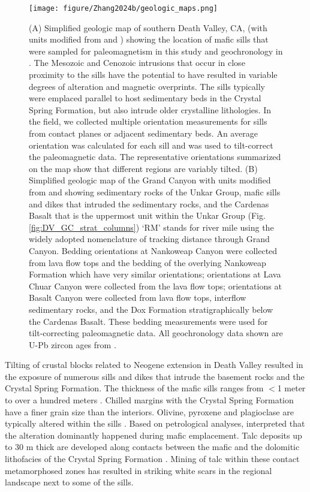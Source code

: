 \begin{figure}[h!]
\centering
\texttt{[image: figure/Zhang2024b/geologic\_maps.png]}
\caption{\footnotesize (A) Simplified geologic map of southern Death Valley, CA, (with units modified from \cite{Workman2003a} and \cite{Wrucke2007a}) showing the location of mafic sills that were sampled for paleomagnetism in this study and geochronology in \cite{Mohr2024a}. The Mesozoic and Cenozoic intrusions that occur in close proximity to the sills have the potential to have resulted in variable degrees of alteration and magnetic overprints. The sills typically were emplaced parallel to host sedimentary beds in the Crystal Spring Formation, but also intrude older crystalline lithologies. In the field, we collected multiple orientation measurements for sills from contact planes or adjacent sedimentary beds. An average orientation was calculated for each sill and was used to tilt-correct the paleomagnetic data. The representative orientations summarized on the map show that different regions are variably tilted. (B) Simplified geologic map of the Grand Canyon with units modified from \cite{Billingsley2000a} and \cite{Billingsley2003a} showing sedimentary rocks of the Unkar Group, mafic sills and dikes that intruded the sedimentary rocks, and the Cardenas Basalt that is the uppermost unit within the Unkar Group (Fig. \ref{fig:DV_GC_strat_columns}) `RM' stands for river mile using the widely adopted nomenclature of tracking distance through Grand Canyon. Bedding orientations at Nankoweap Canyon were collected from lava flow tops and the bedding of the overlying Nankoweap Formation which have very similar orientations; orientations at Lava Chuar Canyon were collected from the lava flow tops; orientations at Basalt Canyon were collected from lava flow tops, interflow sedimentary rocks, and the Dox Formation stratigraphically below the Cardenas Basalt. These bedding measurements were used for tilt-correcting paleomagnetic data. All geochronology data shown are U-Pb zircon ages from \cite{Mohr2024a}.}
\label{fig:geologic_maps}
\end{figure}

Tilting of crustal blocks related to Neogene extension in Death Valley resulted in the exposure of numerous sills and dikes that intrude the basement rocks and the Crystal Spring Formation. The thickness of the mafic sills ranges from $<$1 meter to over a hundred meters \citep{Wright1968a, Hammond1983a}. Chilled margins with the Crystal Spring Formation have a finer grain size than the interiors. Olivine, pyroxene and plagioclase are typically altered within the sills \citep{Hammond1983a}. Based on petrological analyses, \cite{Hammond1983a} interpreted that the alteration dominantly happened during mafic emplacement. Talc deposits up to 30 m thick are developed along contacts between the mafic and the dolomitic lithofacies of the Crystal Spring Formation \citep{Wright1968a}. Mining of talc within these contact metamorphosed zones has resulted in striking white scars in the regional landscape next to some of the sills.


